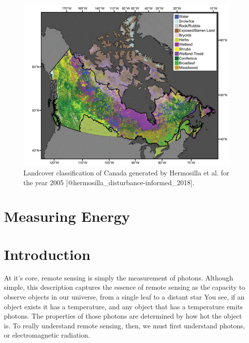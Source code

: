 \documentclass[
]{book}
\begin{document}
\begin{figure}
\includegraphics[width=10.64in]{images/11-hermosilla-canada-landcover} \caption{Landcover classification of Canada generated by Hermosilla et al. for the year 2005 [@hermosilla_disturbance-informed_2018].}\label{fig:11-hermosilla-canada-landcover}
\end{figure}

\hypertarget{measuring-energy}{%
\section{Measuring Energy}\label{measuring-energy}}

\hypertarget{introduction}{%
\section{Introduction}\label{introduction}}

At it's core, remote sensing is simply the measurement of photons.
Although simple, this description captures the essence of remote
sensing as the capacity to observe objects in our universe, from a single
leaf to a distant star You see, if an object exists it has a
temperature, and any object that has a temperature emits photons. The
properties of those photons are determined by how hot the object is. To
really understand remote sensing, then, we must first understand
photons, or electromagnetic radiation.
\end{document}
